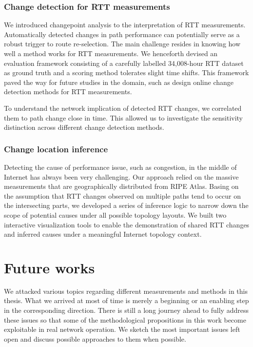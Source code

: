 \subsection{Change detection for RTT measurements}

We introduced changepoint analysis to the interpretation of RTT measurements.
Automatically detected changes in path performance can potentially serve as a robust trigger to route re-selection.
The main challenge resides in knowing how well a method works for RTT measurements.
We henceforth devised an evaluation framework consisting of a carefully labelled 34,008-hour RTT dataset as ground truth and a scoring method tolerates slight time shifts. This framework paved the way for future studies in the domain, such as design online change detection methods for RTT measurements.

To understand the network implication of detected RTT changes, we correlated them to path change close in time.
This allowed us to investigate the sensitivity distinction across different change detection methods.

\subsection{Change location inference}
Detecting the cause of performance issue, such as congestion, in the middle of Internet has always been very challenging. 
Our approach relied on the massive measurements that are geographically distributed from RIPE Atlas. Basing on the assumption that RTT changes observed on multiple paths tend to occur on the intersecting parts, we developed a series of inference logic to narrow down the scope of potential causes under all possible topology layouts.
We built two interactive visualization tools to enable the demonstration of shared RTT changes and inferred causes under a meaningful Internet topology context.


\chapter{Future works}
We attacked various topics regarding different measurements and methods in this thesis.
What we arrived at most of time is merely a beginning or an enabling step in the corresponding direction.
There is still a long journey ahead to fully address these issues so that some of the methodological propositions in this work become exploitable in real network operation.
We sketch the most important issues left open and discuss possible approaches to them when possible.

